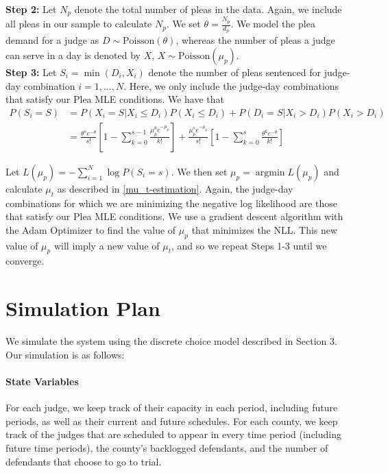 \documentclass[11pt]{article}
\DeclareMathOperator*{\argmin}{argmin}
\theoremstyle{ModifiedStyle}
\theoremstyle{ModifiedStyle}
\begin{document}
      \noindent \textbf{Step 2:} Let $N_p$ denote the total number of pleas in the data. Again, we include all pleas in our sample to calculate $N_p$. We set $\theta = \frac{N_p}{d_p}$. We model the plea demand for a judge as $D \sim \text{Poisson}(\theta)$, whereas the number of pleas a judge can serve in a day is denoted by $X$, $X \sim \text{Poisson}(\mu_p)$. \\

      \noindent \textbf{Step 3:} Let $S_i = \min(D_i,X_i)$ denote the number of pleas sentenced for judge-day combination $i=1,...,N$. Here, we only include the judge-day combinations that satisfy our Plea MLE conditions. We have that
			\begin{align*}
				P(S_i = S) &= P(X_i = S | X_i \leq D_i) P(X_i \leq D_i) + P(D_i = S | X_i > D_i) P(X_i > D_i) \\
          &= \frac{\theta^s e^{-\theta}}{s!}[1-\sum_{k=0}^{s-1}\frac{\mu_p^k e^{-\mu_p}}{k!}] + \frac{\mu_p^s e^{-\mu_p}}{s!}[1-\sum_{k=0}^s \frac{\theta^k e^{-\theta}}{k!}]
			\end{align*}

      Let $L(\mu_p) = -\sum_{i=1}^N \log P(S_i = s)$. We then set
			 $\mu_p = \argmin L(\mu_p)$ and calculate $\mu_t$ as described in \ref{mu_t-estimation}. Again, the judge-day combinations for which we are minimizing the negative log likelihood are those that satisfy our Plea MLE conditions. We use a gradient descent algorithm with the Adam Optimizer to find the value of $\mu_p$ that minimizes the NLL. This new value of $\mu_p$ will imply a new value of $\mu_t$, and so we repeat Steps 1-3 until we converge.

\section{Simulation Plan}
  We simulate the system using the discrete choice model described in Section 3. Our simulation is as follows:

  \paragraph{State Variables} For each judge, we keep track of their capacity in each period, including future periods, as well as their current and future schedules. For each county, we keep track of the judges that are scheduled to appear in every time period (including future time periods), the county's backlogged defendants, and the number of defendants that choose to go to trial.
\end{document}
